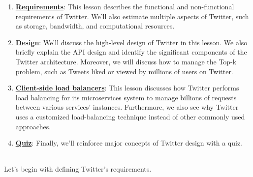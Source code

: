 \begin{enumerate}
\item
\protect{}\label{prieBFGaOlDnsWVMuYu9l}
\href{https://www.educative.io/courses/grokking-the-system-design-interview/requirements-of-twitters-design}{\textbf{Requirements}}: This lesson describes the functional and non-functional requirements of Twitter. We'll also estimate multiple aspects of Twitter, such as storage, bandwidth, and computational resources.
\item
\protect{}\label{r5FECyjxOGOaH14IgrStM}
\href{https://www.educative.io/courses/grokking-the-system-design-interview/high-level-design-of-twitter}{\textbf{Design}}: We'll discuss the high-level design of Twitter in this lesson. We also briefly explain the API design and identify the significant components of the Twitter architecture. Moreover, we will discuss how to manage the Top-k problem, such as Tweets liked or viewed by millions of users on Twitter.
\item
\protect{}\label{5Nq27q1EREm1w-BnpNL5l}
\href{https://www.educative.io/courses/grokking-the-system-design-interview/client-side-load-balancer-for-twitter}{\textbf{Client-side load balancers}}: This lesson discusses how Twitter performs load balancing for its microservices system to manage billions of requests between various services' instances. Furthermore, we also see why Twitter uses a customized load-balancing technique instead of other commonly used approaches.
\item
\protect{}\label{2_i-DPA9w480iQgo-W6jN}
\href{https://www.educative.io/courses/grokking-the-system-design-interview/quiz-on-twitters-design}{\textbf{Quiz}}: Finally, we'll reinforce major concepts of Twitter design with a quiz.
\end{enumerate}
\\
Let's begin with defining Twitter's requirements.

